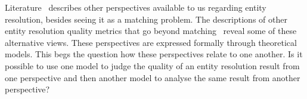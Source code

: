 Literature~\cite{Tal11} describes other perspectives available to us regarding
entity resolution, besides seeing it as a matching problem.
The descriptions of other entity resolution quality metrics that go beyond
matching~\cite{Men10,tal2007algebraic} reveal some of these alternative
views.
These perspectives are expressed formally through theoretical
models\cite{Ben2009Swoosh,Tal11}.
This begs the question how these perspectives relate to one another.
Is it possible to use one model to judge the quality of an entity resolution
result from one perspective and then another model to analyse the same result
from another perspective?
